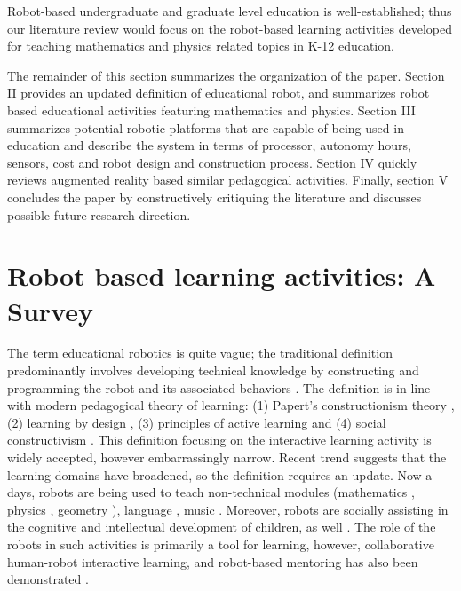\documentclass[conference]{IEEEtran}
\begin{document}
Robot-based undergraduate and graduate level education is well-established; thus our literature review would focus on 
the robot-based learning activities developed for teaching mathematics and physics related topics in K-12 education.

The remainder of this section summarizes the organization of the paper. Section II provides an updated definition of 
educational robot, and summarizes robot based educational activities featuring mathematics and physics. Section III 
summarizes potential robotic platforms that are capable of being used in education and describe the system in terms 
of processor, autonomy hours, sensors, cost and robot design and construction process. Section IV quickly reviews 
augmented reality based similar pedagogical activities. Finally, section V concludes the paper by constructively 
critiquing the literature and discusses possible future research direction.
\section{Robot based learning activities: A Survey}
The term educational robotics is quite vague; the traditional definition predominantly involves developing technical 
knowledge by constructing and programming the robot and its associated behaviors \cite{hsiu2003designing, 
barker2007robotics, balch2008designing}. The definition is in-line with modern pedagogical theory of learning: (1) 
Papert's constructionism theory \cite{papert1980mindstorms, ackermann2001piaget}, (2) learning by design 
\cite{goldman2004using}, (3) principles of active learning \cite{harmin2006inspiring} and (4) social constructivism 
\cite{vygotsky1980mind}. This definition focusing on the interactive learning activity is widely accepted, however 
embarrassingly narrow. Recent trend suggests that the learning domains have broadened, so the definition requires an 
update. Now-a-days, robots are being used to teach non-technical modules (mathematics \cite{highfield2008early, 
robotmath}, physics \cite{mitnik2008autonomous}, geometry \cite{mitnik2008autonomous, robotmath}), language 
\cite{kanda2004interactive, han2009r}, music \cite{han2009physical}. Moreover, robots are socially assisting in the 
cognitive and intellectual development of children, as well \cite{mataric1999socially}. The role of the robots in such 
activities is primarily a tool for learning, however, collaborative human-robot interactive learning, and robot-based 
mentoring has also been demonstrated \cite{mitnik2008autonomous}.
\end{document}
